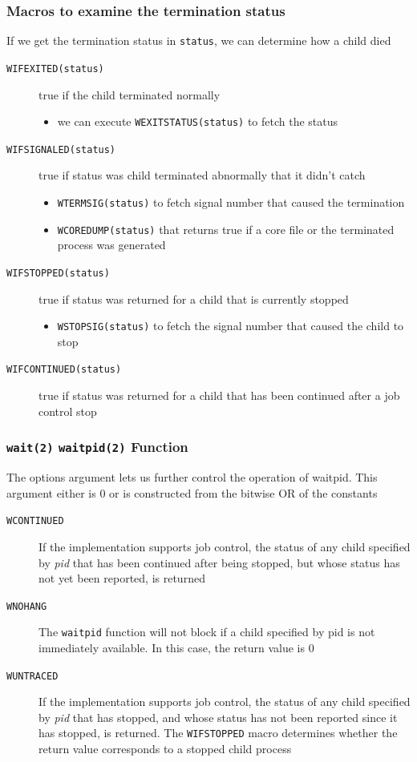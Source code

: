 \documentclass[newPxFont,sthlmFooter,nooffset]{beamer}
\begin{document}
\begin{frame}[t]
  \frametitle{Macros to examine the termination status}
If we get the termination status in \texttt{status}, we can determine how a child died
\begin{description}
\item[\texttt{WIFEXITED(status)}] true if the child terminated normally
  \begin{itemize}
  \item \footnotesize we can execute \texttt{WEXITSTATUS(status)} to fetch the status
  \end{itemize}
\item[\texttt{WIFSIGNALED(status)}] true if status was child terminated abnormally that it didn't catch
  \begin{itemize}
  \item \footnotesize \texttt{WTERMSIG(status)} to fetch signal number that caused the termination
  \item \footnotesize \texttt{WCOREDUMP(status)} that returns true if a core file or the terminated process was generated
  \end{itemize}
\item[\texttt{WIFSTOPPED(status)}] true if status was returned for a child that is currently stopped
  \begin{itemize}
  \item \footnotesize \texttt{WSTOPSIG(status)} to fetch the signal number that caused the child to stop
  \end{itemize}
\item[\texttt{WIFCONTINUED(status)}] true if status was returned for a child that has been continued after a job control stop
\end{description}
\end{frame}

\begin{frame}[containsverbatim,t]
  \frametitle{\texttt{wait(2)} \texttt{waitpid(2)} Function}
The options argument lets us further control the operation of waitpid. This argument either is 0 or is constructed from the bitwise OR of the constants
  \begin{description}
  \item[\texttt{WCONTINUED}] If the implementation supports job
    control, the status of any child specified by \textit{pid} that
    has been continued after being stopped, but whose status has not
    yet been reported, is returned
  \item[\texttt{WNOHANG}] The \texttt{waitpid} function will not block
    if a child specified by pid is not immediately available. In this
    case, the return value is 0
  \item[\texttt{WUNTRACED}] If the implementation supports job
    control, the status of any child specified by \textit{pid} that
    has stopped, and whose status has not been reported since it has
    stopped, is returned. The \texttt{WIFSTOPPED} macro determines
    whether the return value corresponds to a stopped child process
  \end{description}
\end{frame}
\end{document}
